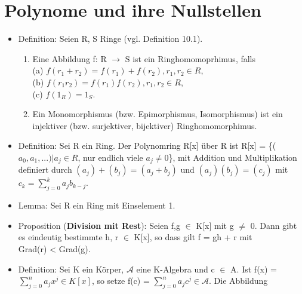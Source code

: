 \section{Polynome und ihre Nullstellen}
\begin{itemize}
\item Definition: Seien R, S Ringe (vgl. Definition 10.1).
\begin{enumerate}
\item Eine Abbildung f: R $\to$ S ist ein Ringhomomoprhimus, falls\\
\hspace*{6.5mm}(a) $f(r_1 +r_2) = f(r_1) + f(r_2), r_1,r_2 \in R$,\\
\hspace*{6.5mm}(b) $f(r_1r_2) = f(r_1)f(r_2), r_1,r_2 \in R$,\\
\hspace*{6.5mm}(c) $f(1_R) = 1_S$.
\item Ein Monomorphismus (bzw. Epimorphismus, Isomorphismus) ist ein injektiver (bzw. surjektiver, bijektiver) \hspace*{4.5mm} Ringhomomorphimus.
\end{enumerate}
\item Definition: Sei R ein Ring. Der Polynomring R[x] über R ist R[x] = \{($a_0,a_1,...) | a_j \in R$, nur endlich viele $a_j \neq 0$\},
mit Addition und Multiplikation definiert durch $(a_j) + (b_j) = (a_j + b_j)$ und $(a_j)(b_j) = (c_j)$ mit $c_k = \sum\nolimits_{j=0}^{k} a_j b_{k-j}$.
\item Lemma: Sei R ein Ring mit Einselement 1.
\item Proposition (\textbf{Division mit Rest}): Seien f,g $\in$ K[x] mit g $\neq$ 0. Dann gibt es eindeutig bestimmte h, r $\in$ K[x], so dass gilt f = gh + r mit \\Grad(r) < Grad(g).
\item Definition: Sei K ein Körper, $\mathcal{A}$ eine K-Algebra und c $\in$ A. Ist f(x) = $\sum\nolimits_{j=0}^{n} a_j x^j \in K[x]$, so setze f(c) = $\sum\nolimits_{j=0}^{n} a_j c^j \in \mathcal{A}$. Die Abbildung

\end{itemize}
